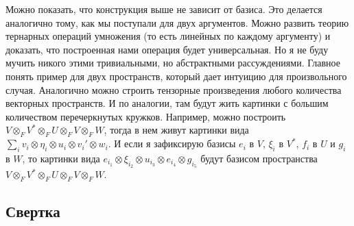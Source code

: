 Можно показать, что конструкция выше не зависит от базиса.
Это делается аналогично тому, как мы поступали для двух аргументов.
Можно развить теорию тернарных операций умножения (то есть линейных по каждому аргументу) и доказать, что построенная нами операция будет универсальная.
Но я не буду мучить никого этими тривиальными, но абстрактными рассуждениями.
Главное понять пример для двух пространств, который дает интуицию для произвольного случая.
Аналогично можно строить тензорные произведения любого количества векторных пространств.
И по аналогии, там будут жить картинки с большим количеством перечеркнутых кружков.
Например, можно построить $V\otimes_F V^* \otimes_F U \otimes_F V \otimes_F W$, тогда в нем живут картинки вида $\sum_i v_i\otimes \eta_i\otimes u_i \otimes v_i'\otimes w_i$.
И если я зафиксирую базисы $e_i$ в $V$, $\xi_i$ в $V^*$, $f_i$ в $U$ и $g_i$ в $W$, то картинки вида $e_{i_1}\otimes \xi_{i_2}\otimes u_{i_3}\otimes e_{i_4}\otimes g_{i_5}$ будут базисом пространства $V\otimes_F V^* \otimes_F U \otimes_F V \otimes_F W$.


\subsection{Свертка}


